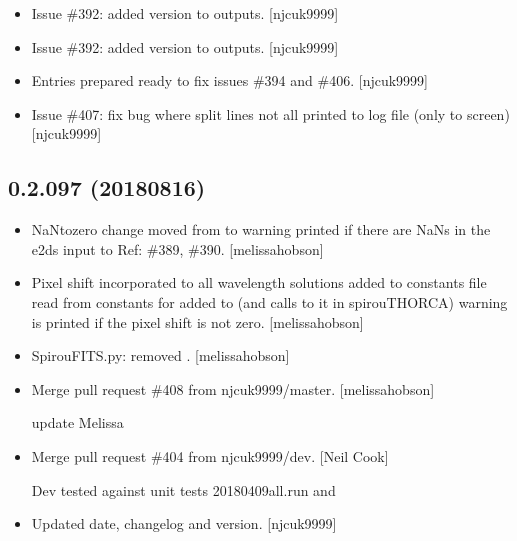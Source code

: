 \documentclass[a4paper,10pt,english]{report}
\begin{document}
\begin{itemize}
\item {} 
Issue \#392: added version to outputs. {[}njcuk9999{]}

\item {} 
Issue \#392: added version to outputs. {[}njcuk9999{]}

\item {} 
Entries prepared ready to fix issues \#394 and \#406. {[}njcuk9999{]}

\item {} 
Issue \#407: fix bug where split lines not all printed to log file
(only to screen) {[}njcuk9999{]}

\end{itemize}


\subsection{0.2.097 (2018\sphinxhyphen{}08\sphinxhyphen{}16)}
\label{\detokenize{misc/changelog:id387}}\begin{itemize}
\item {} 
NaN\sphinxhyphen{}to\sphinxhyphen{}zero change moved from  to  \sphinxhyphen{} warning
printed if there are NaNs in the e2ds input to  \sphinxhyphen{} Ref: \#389,
\#390. {[}melissa\sphinxhyphen{}hobson{]}

\item {} 
Pixel shift incorporated to all wavelength solutions \sphinxhyphen{} added to
constants file \sphinxhyphen{} read from constants for  \sphinxhyphen{}
added to  (and calls to it in
spirouTHORCA) \sphinxhyphen{} warning is printed if the pixel shift is not zero.
{[}melissa\sphinxhyphen{}hobson{]}

\item {} 
SpirouFITS.py: removed . {[}melissa\sphinxhyphen{}hobson{]}

\item {} 
Merge pull request \#408 from njcuk9999/master. {[}melissa\sphinxhyphen{}hobson{]}

update Melissa

\item {} 
Merge pull request \#404 from njcuk9999/dev. {[}Neil Cook{]}

Dev \sphinxhyphen{} tested against unit tests 20180409all.run and 

\item {} 
Updated date, changelog and version. {[}njcuk9999{]}

\end{itemize}
\end{document}
